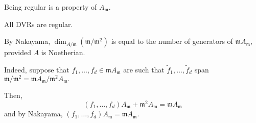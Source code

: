 \begin{note}
  Being regular is a property of \(A_{\mathfrak m}.\)
\end{note}

\begin{example}
  All DVRs are regular.
\end{example}

\begin{note}
  By Nakayama, \(\dim_{A/{\mathfrak m}}(\mathfrak m/{\mathfrak m^2})\) is equal to the number of generators of \(\mathfrak m A_{\mathfrak m},\) provided \(A\) is Noetherian.

  Indeed, suppose that \(f_1, \dotsc, f_d \in \mathfrak m A_{\mathfrak m}\) are such that \(\tilde{f}_1, \dotsc, \tilde{f}_d\) span \(\mathfrak m /{\mathfrak m^2} = \mathfrak m A_{\mathfrak m}/{\mathfrak m^2 A_{\mathfrak m}}.\)

  Then,
  \[(f_1, \dotsc, f_d) A_{\mathfrak m} + \mathfrak m^2 A_{\mathfrak m} = \mathfrak m A_{\mathfrak m}\]
  and by Nakayama, \((f_1, \dotsc, f_d) A_{\mathfrak m} = \mathfrak m A_{\mathfrak m}.\)
\end{note}






